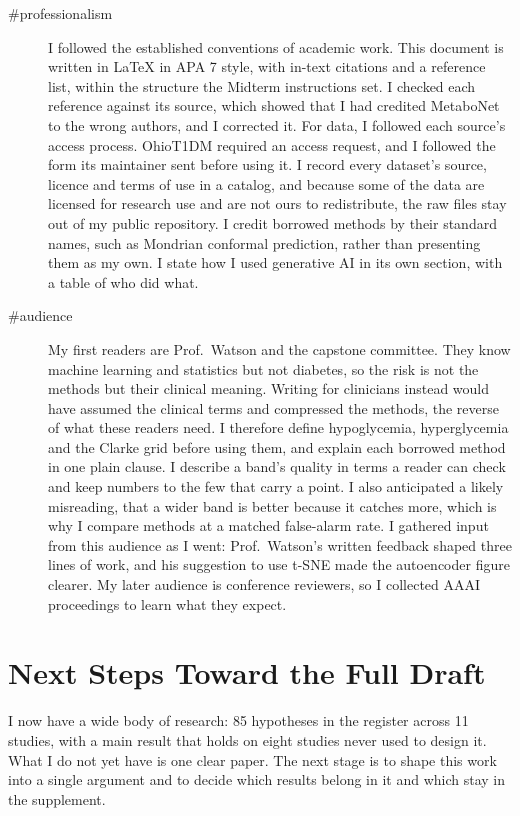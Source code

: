 \begin{description}
\item[\#professionalism] I followed the established conventions of academic work. This document is written in LaTeX in APA 7 style, with in-text citations and a reference list, within the structure the Midterm instructions set. I checked each reference against its source, which showed that I had credited MetaboNet to the wrong authors, and I corrected it. For data, I followed each source's access process. OhioT1DM required an access request, and I followed the form its maintainer sent before using it. I record every dataset's source, licence and terms of use in a catalog, and because some of the data are licensed for research use and are not ours to redistribute, the raw files stay out of my public repository. I credit borrowed methods by their standard names, such as Mondrian conformal prediction, rather than presenting them as my own. I state how I used generative AI in its own section, with a table of who did what. 
\item[\#audience] My first readers are Prof.\ Watson and the capstone committee. They know machine learning and statistics but not diabetes, so the risk is not the methods but their clinical meaning. Writing for clinicians instead would have assumed the clinical terms and compressed the methods, the reverse of what these readers need. I therefore define hypoglycemia, hyperglycemia and the Clarke grid before using them, and explain each borrowed method in one plain clause. I describe a band's quality in terms a reader can check and keep numbers to the few that carry a point. I also anticipated a likely misreading, that a wider band is better because it catches more, which is why I compare methods at a matched false-alarm rate. I gathered input from this audience as I went: Prof.\ Watson's written feedback shaped three lines of work, and his suggestion to use t-SNE made the autoencoder figure clearer.  My later audience is conference reviewers, so I collected AAAI proceedings to learn what they expect.
\end{description}

\section{Next Steps Toward the Full Draft}

I now have a wide body of research: 85 hypotheses in the register across 11 studies, with a main result that holds on eight studies never used to design it. What I do not yet have is one clear paper. The next stage is to shape this work into a single argument and to decide which results belong in it and which stay in the supplement.

